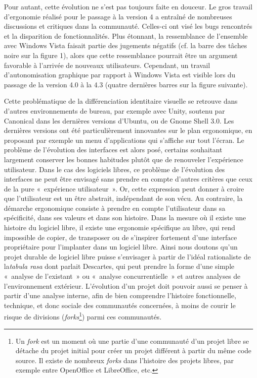 \documentclass{FramateX}
\begin{document}
\begin{refsection}
Pour autant, cette évolution ne s'est pas toujours faite en douceur. Le
gros travail d'ergonomie réalisé pour le passage à la version 4 a
entraîné de nombreuses discussions et critiques dans la communauté.
Celles-ci ont visé les bugs rencontrés et la disparition de
fonctionnalités. Plus étonnant, la ressemblance de l'ensemble avec
Windows Vista faisait partie des jugements négatifs (cf. la barre des
tâches noire sur la figure 1), alors que cette ressemblance pourrait
être un argument favorable à l'arrivée de nouveaux utilisateurs.
Cependant, un travail d'autonomisation graphique par rapport à Windows
Vista est visible lors du passage de la version 4.0 à la 4.3 (quatre
dernières barres sur la figure suivante). 

Cette problématique de la différenciation identitaire visuelle se
retrouve dans d'autres environnements de bureau, par exemple avec
Unity, soutenu par Canonical dans les dernières versions d'Ubuntu, ou
de Gnome Shell 3.0. Les dernières versions ont été particulièrement
innovantes sur le plan ergonomique, en proposant par exemple un menu
d'applications qui s'affiche sur tout l'écran. Le problème de
l'évolution des interfaces est alors posé, certains souhaitant
largement conserver les bonnes habitudes plutôt que de renouveler
l'expérience utilisateur. Dans le cas des logiciels libres, ce problème
de l'évolution des interfaces ne peut être envisagé sans prendre en
compte d'autres critères que ceux de la pure «~expérience
utilisateur~». Or, cette expression peut donner à croire que
l'utilisateur est un être abstrait, indépendant de son vécu. Au
contraire, la démarche ergonomique consiste à prendre en compte
l'utilisateur dans sa spécificité, dans ses valeurs et dans son
histoire. Dans la mesure où il existe une histoire du logiciel libre,
il existe une ergonomie spécifique au libre, qui rend impossible de
copier, de transposer ou de s'inspirer fortement d'une interface
propriétaire pour l'implanter dans un logiciel libre. Ainsi nous
doutons qu'un projet durable de logiciel libre puisse s'envisager à
partir de l'idéal rationaliste de la\textit{tabula rasa} dont
parlait Descartes, qui peut prendre la forme d'une simple «~analyse de
l'existant~» ou «~analyse concurrentielle~» et autres analyses de
l'environnement extérieur. L'évolution d'un projet doit pouvoir aussi
se penser à partir d'une analyse interne, afin de bien comprendre
l'histoire fonctionnelle, technique, et donc sociale des communautés
concernées, à moins de courir le risque de divisions (\textit{forks}\footnote{Un \textit{fork} est un moment
où une partie d'une communauté d'un projet libre se détache du projet
initial pour créer un projet différent à partir du même code source. Il
existe de nombreux \textit{forks} dans l'histoire des projets libres, par
exemple entre OpenOffice et LibreOffice, etc.}) parmi ces communautés.



\end{refsection}
\end{document}
